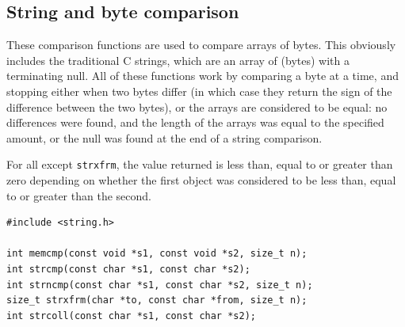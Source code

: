   

  \subsection{String and byte comparison}
   

   These comparison functions are used to compare arrays of bytes.  This
    obviously includes the traditional C strings, which are an array of
    \kchar{} (bytes) with a terminating null.  All of these functions
    work by comparing a byte at a time, and stopping either when two bytes
    differ (in which case they return the sign of the difference between the
    two bytes), or the arrays are considered to be equal: no differences were
    found, and the length of the arrays was equal to the specified amount, or
    the null was found at the end of a string comparison.


   For all except \texttt{strxfrm}, the value returned is less than,
    equal to or greater than zero depending on whether the first object was
    considered to be less than, equal to or greater than the second.


   \begin{Verbatim}
#include <string.h>

int memcmp(const void *s1, const void *s2, size_t n);
int strcmp(const char *s1, const char *s2);
int strncmp(const char *s1, const char *s2, size_t n);
size_t strxfrm(char *to, const char *from, size_t n); 
int strcoll(const char *s1, const char *s2);
\end{Verbatim}

